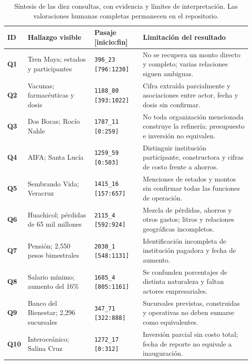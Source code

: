 \documentclass[10pt,a4paper]{article}
\newcommand{\tinyfont}{\fontsize{8.8}{11.4}\selectfont}
\begin{document}
\begin{table}[H]
\centering\tinyfont
\caption{Síntesis de las diez consultas, con evidencia y límites de interpretación. Las valoraciones humanas completas permanecen en el repositorio.}
\begin{tabularx}{\linewidth}{@{}>{\bfseries}p{8mm}p{34mm}p{31mm}X@{}}
\toprule
\textbf{ID} & \textbf{Hallazgo visible} & \textbf{Pasaje [inicio:fin]} & \textbf{Limitación del resultado}\\
\midrule
Q1 & Tren Maya; estados y participantes & \texttt{396\_23 [796:1230]} & No se recupera un monto directo y completo; varias relaciones siguen ambiguas.\\
\addlinespace[2pt]
Q2 & Vacunas; farmacéuticas y dosis & \texttt{1188\_80 [393:1022]} & Cifra extraída parcialmente y asociaciones entre actor, fecha y dosis sin confirmar.\\
\addlinespace[2pt]
Q3 & Dos Bocas; Rocío Nahle & \texttt{1787\_11 [0:259]} & No toda organización mencionada construye la refinería; presupuesto e inversión no equivalen.\\
\addlinespace[2pt]
Q4 & AIFA; Santa Lucía & \texttt{1259\_59 [0:503]} & Distinguir institución participante, constructora y cifras de costo frente a ahorros.\\
\addlinespace[2pt]
Q5 & Sembrando Vida; Veracruz & \texttt{1415\_16 [157:657]} & Menciones de estados y montos sin confirmar todas las funciones de operación.\\
\addlinespace[2pt]
Q6 & Huachicol; pérdidas de 65 mil millones & \texttt{2115\_4 [592:924]} & Mezcla de pérdidas, ahorros y otros gastos; litros y relaciones geográficas incompletos.\\
\addlinespace[2pt]
Q7 & Pensión; 2,550 pesos bimestrales & \texttt{2030\_1 [548:1131]} & Identificación incompleta de institución pagadora y fecha de aumento.\\
\addlinespace[2pt]
Q8 & Salario mínimo; aumento del 16\% & \texttt{1685\_4 [805:1161]} & Se confunden porcentajes de distinta naturaleza y faltan actores empresariales.\\
\addlinespace[2pt]
Q9 & Banco del Bienestar; 2,296 sucursales & \texttt{347\_71 [322:888]} & Sucursales previstas, construidas y operativas no deben sumarse como equivalentes.\\
\addlinespace[2pt]
Q10 & Interoceánico; Salina Cruz & \texttt{1272\_17 [0:312]} & Inversión parcial sin costo total; fecha de reporte no equivale a inauguración.\\
\bottomrule
\end{tabularx}
\end{table}
\end{document}
